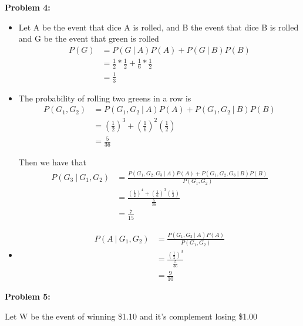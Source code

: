 \documentclass[12pt]{article}
\begin{document}
\noindent \textbf{Problem 4:}

\begin{itemize}
    \item [(a)]
          Let A be the event that dice A is rolled, and B the event that dice B is rolled and G be the event that green is rolled
          \begin{align*}
              P(G) & = P(G ~|~ A)P(A) + P(G ~|~ B)P(B)                       \\
                   & = \frac{1}{2} * \frac{1}{2} + \frac{1}{6} * \frac{1}{2} \\
                   & = \frac{1}{3}
          \end{align*}

    \item [(b)]

          The probability of rolling two greens in a row is
          \begin{align*}
              P(G_1, G_2) & = P(G_1, G_2 ~|~ A)P(A) + P(G_1, G_2 ~|~ B)P(B)  \\
                          & = (\frac{1}{2})^3 + (\frac{1}{6})^2(\frac{1}{2}) \\
                          & = \frac{5}{36}
          \end{align*}

          Then we have that
          \begin{align*}
              P(G_3 ~|~ G_1, G_2) & =  \frac{P(G_1, G_2,G_3 ~|~ A)P(A) + P(G_1, G_2, G_3 ~|~ B)P(B)}{ P(G_1, G_2)} \\
                                  & = \frac{(\frac{1}{2})^4 + (\frac{1}{6})^3(\frac{1}{2})}{\frac{5}{36}}          \\
                                  & = \frac{7}{15}
          \end{align*}
    \item [(c)]
          \begin{align*}
              P(A ~|~ G_1, G_2) & = \frac{P(G_1, G_2 ~|~ A) P(A)}{P(G_1, G_2)} \\
                                & = \frac{(\frac{1}{2})^3}{\frac{5}{36}}       \\
                                & = \frac{9}{10}
          \end{align*}

\end{itemize}

\noindent \textbf{Problem 5:}

Let W be the event of winning \$1.10 and it's complement losing \$1.00
\end{document}
